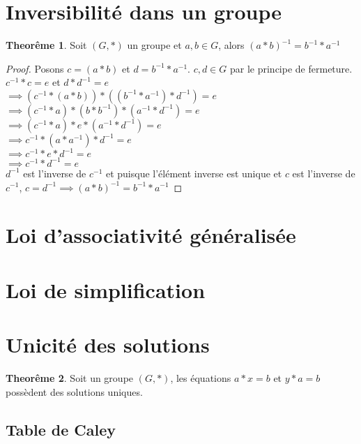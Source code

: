 \documentclass[12pt]{book}
\def\sep{\phantom{}}
\theoremstyle{definition}
\newtheorem{theorem}{Theorême}[section]
\begin{document}
\section{Inversibilité dans un groupe}
\begin{theorem}
    \label{thm:groupe_inversible}
    Soit $(G, \ast)$ un groupe et $a, b \in G$, alors $(a \ast b)^{-1} = b^{-1} \ast a^{-1}$
\end{theorem}
\begin{proof}
    Posons $c = (a \ast b)$ et $d = b^{-1} \ast a^{-1}$. \sep
    $c, d \in G$ par le principe de fermeture. \sep \\
    $c^{-1} \ast c = e$ et $d \ast d^{-1} = e$ \sep \\
    $\implies (c^{-1} \ast (a \ast b)) \ast ((b^{-1} \ast a^{-1}) \ast d^{-1}) = e$ \sep \\
    $\implies (c^{-1} \ast a) \ast (b \ast b^{-1}) \ast (a^{-1} \ast d^{-1}) = e$ \sep \\
    $\implies (c^{-1} \ast a) \ast e \ast (a^{-1} \ast d^{-1}) = e$ \sep \\
    $\implies c^{-1} \ast (a \ast a^{-1}) \ast d^{-1} = e$ \sep \\
    $\implies c^{-1} \ast e \ast d^{-1} = e$ \sep \\
    $\implies c^{-1} \ast d^{-1} = e$ \sep \\
    $d^{-1}$ est l'inverse de $c^{-1}$ et puisque l'élément inverse est unique et $c$ est l'inverse de $c^{-1}$, $c = d^{-1}\implies (a \ast b)^{-1} = b^{-1} \ast a^{-1}$
\end{proof}
\section{Loi d'associativité généralisée}
\section{Loi de simplification}
\section{Unicité des solutions}
\begin{theorem}
    Soit un groupe $(G, \ast)$, les équations $a \ast x = b$ et $y \ast a = b$ possèdent des solutions uniques.
\end{theorem}
\subsection{Table de Caley}
\end{document}
